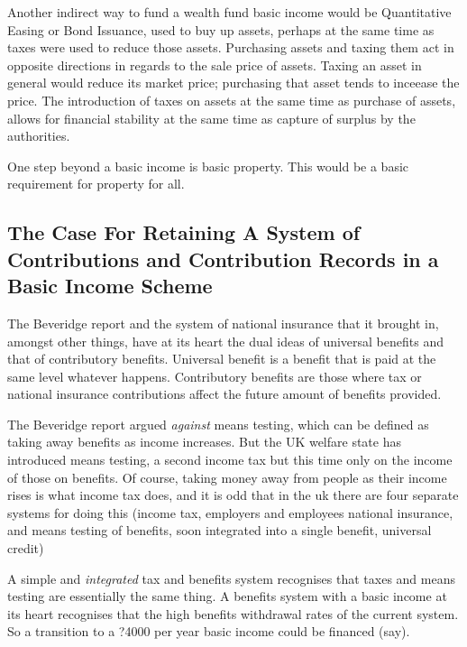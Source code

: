 \documentclass[]{tufte-handout}
\begin{document}
Another indirect way to fund a wealth fund basic income would be
Quantitative Easing or Bond Issuance, used to buy up assets, perhaps at
the same time as taxes were used to reduce those assets. Purchasing
assets and taxing them act in opposite directions in regards to the sale
price of assets. Taxing an asset in general would reduce its market
price; purchasing that asset tends to inceease the price. The
introduction of taxes on assets at the same time as purchase of assets,
allows for financial stability at the same time as capture of surplus by
the authorities.

One step beyond a basic income is basic property. This would be a basic
requirement for property for all.

\hypertarget{the-case-for-retaining-a-system-of-contributions-and-contribution-records-in-a-basic-income-scheme}{%
\subsection{The Case For Retaining A System of Contributions and
Contribution Records in a Basic Income
Scheme}\label{the-case-for-retaining-a-system-of-contributions-and-contribution-records-in-a-basic-income-scheme}}

The Beveridge report and the system of national insurance that it
brought in, amongst other things, have at its heart the dual ideas of
universal benefits and that of contributory benefits. Universal benefit
is a benefit that is paid at the same level whatever happens.
Contributory benefits are those where tax or national insurance
contributions affect the future amount of benefits provided.

The Beveridge report argued \emph{against} means testing, which can be
defined as taking away benefits as income increases. But the UK welfare
state has introduced means testing, a second income tax but this time
only on the income of those on benefits. Of course, taking money away
from people as their income rises is what income tax does, and it is odd
that in the uk there are four separate systems for doing this (income
tax, employers and employees national insurance, and means testing of
benefits, soon integrated into a single benefit, universal credit)

A simple and \emph{integrated} tax and benefits system recognises that
taxes and means testing are essentially the same thing. A benefits
system with a basic income at its heart recognises that the high
benefits withdrawal rates of the current system. So a transition to a
?4000 per year basic income could be financed (say).
\end{document}
